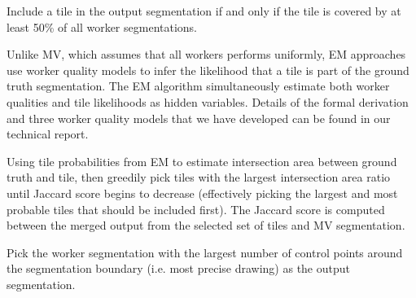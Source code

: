 \par \noindent Include a tile in the output segmentation if and only if the tile is covered by at least 50\% of all worker segmentations.

\par \noindent Unlike MV, which assumes that all workers performs uniformly, EM approaches use worker quality models to infer the likelihood that a tile is part of the ground truth segmentation. The EM algorithm simultaneously estimate both worker qualities and tile likelihoods as hidden variables. Details of the formal derivation and three worker quality models that we have developed can be found in our technical report.

\par \noindent Using tile probabilities from EM to estimate intersection area between ground truth and tile, then greedily pick tiles with the largest intersection area ratio until Jaccard score begins to decrease (effectively picking the largest and most probable tiles that should be included first). The Jaccard score is computed between the merged output from the selected set of tiles and MV segmentation.

\par \noindent Pick the worker segmentation with the largest number of control points around the segmentation boundary (i.e. most precise drawing) as the output segmentation.